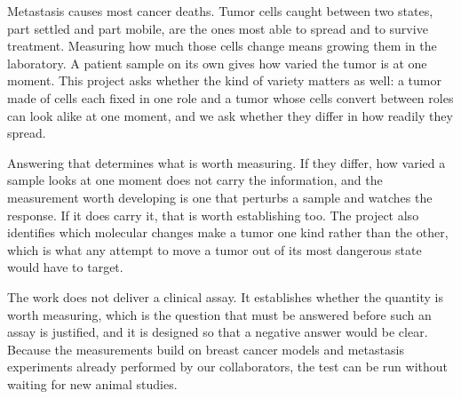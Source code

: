 \documentclass[12pt,letterpaper]{article}
\newcommand{\chg}[1]{\textcolor{chgcolor}{#1}}
\newcommand{\chg}[1]{#1}
\begin{document}
Metastasis causes most cancer deaths. Tumor cells caught between two states, part settled and part mobile, are the ones most able to spread and to survive treatment. Measuring how much those cells change means growing them in the laboratory. A patient sample on its own gives how varied the tumor is at one moment. This project asks whether the kind of variety matters as well: a tumor made of cells each fixed in one role and a tumor whose cells convert between roles can look alike at one moment, and we ask whether they differ in how readily they spread.

Answering that determines what is worth measuring. \chg{If they differ, how varied a sample looks at one moment does not carry the information, and the measurement worth developing is one that perturbs a sample and watches the response.} If it does carry it, that is worth establishing too. The project also identifies which molecular changes make a tumor one kind rather than the other, which is what any attempt to move a tumor out of its most dangerous state would have to target.

The work does not deliver a clinical assay. It establishes whether the quantity is worth measuring, which is the question that must be answered before such an assay is justified, and it is designed so that a negative answer would be clear. Because the measurements build on breast cancer models and metastasis experiments already performed by our collaborators, the test can be run without waiting for new animal studies.
\fi
\end{document}
